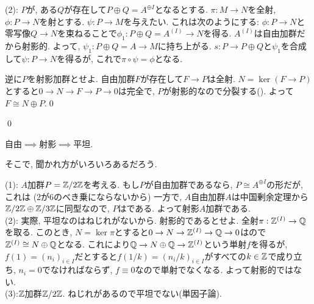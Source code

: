 (2): $P$が, ある$Q$が存在して$P\oplus Q = A^{\oplus I}$となるとする. $\pi:M\to N$を全射, $\phi:P\to N$を射とする. $\psi:P\to M$を与えたい. これは次のようにする: $\phi:P\to N$と零写像$Q\to N$を束ねることで$\phi_1: P\oplus Q = A^{(I)}\to N$を得る. $A^{(I)}$は自由加群だから射影的. よって, $\psi_1: P\oplus Q = A \to M$に持ち上がる. $s:P\to P\oplus Q$と$\psi_1$を合成して$\psi:P\to N$を得るが, これで$\pi\circ \psi = \phi$となる. \par
逆に$P$を射影加群とせよ. 自由加群$F$が存在して$F\to P$は全射. $N = \ker{(F\to P)}$とすると$0\to N \to F \to P\to 0$は完全で, $P$が射影的なので分裂する(). よって$F\cong N\oplus P$.\qed

\qed

\begin{recall}
自由$\implies$射影$\implies$平坦.
\end{recall}
そこで, 聞かれ方がいろいろあるだろう.
\begin{egans}
(1):  $A$加群$P=\mathbb{Z}/2\mathbb{Z}$を考える. もし$P$が自由加群であるなら, $P\cong A^{\oplus I}$の形だが, これは (2が6のべき乗にならないから) 一方で, $A$自由加群$A$は中国剰余定理から$\mathbb{Z}/2\mathbb{Z}\oplus \mathbb{Z}/3\mathbb{Z}$に同型なので, $P$はである. よって射影$A$加群である. \\
(2):  実際, 平坦なのはねじれがないから. 射影的であるとせよ. 全射$\pi:\mathbb{Z}^{(I)}\to \mathbb{Q}$を取る. このとき, $N = \ker{\pi}$とすると$0\to N \to \mathbb{Z}^{(I)} \to \mathbb{Q} \to 0$はので$\mathbb{Z}^{(I)}\cong N\oplus \mathbb{Q}$となる. これにより$\mathbb{Q}\to N\oplus \mathbb{Q} \to \mathbb{Z}^{(I)}$という単射$f$を得るが, $f(1) = (n_i)_{i\in I}$だとすると$f(1/k) = (n_i/k)_{i\in I}$がすべての$k\in \mathbb{Z}$で成り立ち, $n_i = 0$でなければならず, $f\equiv 0$なので単射でなくなる. よって射影的ではない. \\
(3):$\mathbb{Z}$加群$\mathbb{Z}/2\mathbb{Z}$. ねじれがあるので平坦でない(単因子論).

\end{egans}


